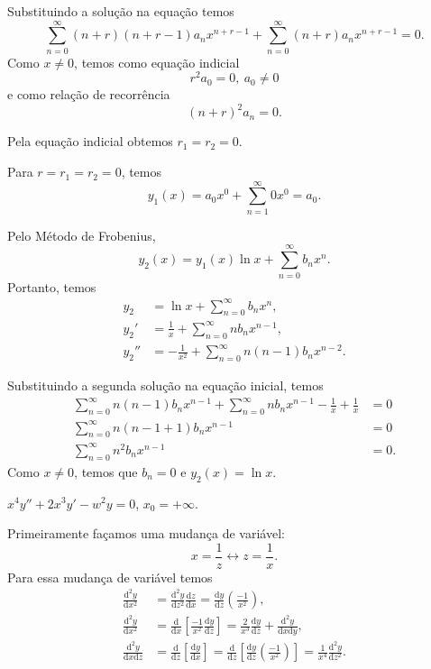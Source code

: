 \documentclass[a4paper,12pt, leqno, answers]{exam}
\newcommand{\devd}[2]{\frac{\mathrm{d} #1}{\mathrm{d} #2}}
\newcommand{\devdt}[2]{\frac{\mathrm{d}^2 #1}{\mathrm{d} #2^2}}
\newcommand{\devdtm}[3]{\frac{\mathrm{d}^2 #1}{\mathrm{d} #2 \mathrm{d} #3}}
\begin{document}
\begin{questions}
\begin{solution}
        Substituindo a solu\c{c}\~{a}o na equa\c{c}\~{a}o temos
        \[
        \sum_{n = 0}^\infty \left( n + r \right) \left( n + r - 1 \right) a_n x^{n + r - 1} + \sum_{n = 0}^\infty \left( n + r \right) a_n x^{n + r - 1} = 0.
        \]
        Como $x \neq 0$, temos como equa\c{c}\~{a}o indicial
        \[
        r^2 a_0 = 0, \ a_0 \neq 0
        \]
        e como rela\c{c}\~{a}o de recorr\^{e}ncia
        \[
        \left( n + r \right)^2 a_n = 0.
        \]

        Pela equa\c{c}\~{a}o indicial obtemos $r_1 = r_2 = 0$.

        Para $r = r_1 = r_2 = 0$, temos
        \[
        y_1(x) = a_0 x^0 + \sum_{n = 1}^\infty 0 x^0 = a_0.
        \]

        Pelo M\'{e}todo de Frobenius,
        \[
        y_2(x) = y_1(x) \ln x + \sum_{n = 0}^\infty b_n x^n.
        \]
        Portanto, temos
        \begin{align*}
            y_2 &= \ln x + \sum_{n = 0}^\infty b_n x^n, \\
            y_2' &= \frac{1}{x} + \sum_{n = 0}^\infty n b_n x^{n - 1}, \\
            y_2'' &= -\frac{1}{x^2} + \sum_{n = 0}^\infty n \left( n - 1 \right) b_n x^{n - 2}.
        \end{align*}

        Substituindo a segunda solu\c{c}\~{a}o na equa\c{c}\~{a}o inicial, temos
        \begin{align*}
            \sum_{n = 0}^\infty n \left( n -1 \right) b_n x^{n - 1} + \sum_{n = 0}^\infty n b_n x^{n - 1} - \frac{1}{x} + \frac{1}{x} &= 0 \\
            \sum_{n = 0}^\infty n \left( n - 1 + 1 \right) b_n x^{n - 1} &= 0 \\
            \sum_{n = 0}^\infty n^2 b_n x^{n - 1} &= 0.
        \end{align*}
        Como $x \neq 0$, temos que $b_n = 0$ e $y_2(x) = \ln x$.
    \end{solution}

    \question $x^4 y'' + 2 x^3 y' - w^2 y = 0$, $x_0 = + \infty$.
    \begin{solution}
        Primeiramente fa\c{c}amos uma mudan\c{c}a de vari\'{a}vel:
        \[
        x = \frac{1}{z} \leftrightarrow z = \frac{1}{x}.
        \]
        Para essa mudan\c{c}a de vari\'{a}vel temos
        \begin{align*}
            \devdt{y}{x} &= \devdt{y}{z} \devd{z}{x} = \devd{y}{z} \left( \frac{-1}{x^2} \right), \\
            \devdt{y}{x} &=\devd{}{x} \left[ \frac{-1}{x^2} \devd{y}{z} \right] = \frac{2}{x^3} \devd{y}{z} + \devdtm{y}{x}{y}, \\
            \devdtm{y}{x}{z} &= \devd{}{z} \left[ \devd{y}{x} \right] = \devd{}{z} \left[ \devd{y}{z} \left( \frac{-1}{x^2} \right) \right] = \frac{1}{x^4} \devdt{y}{z}.
        \end{align*}


\end{solution}
\end{questions}
\end{document}

